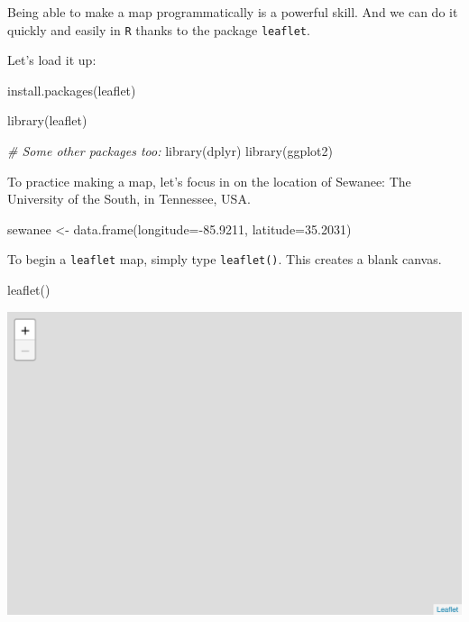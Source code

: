 \documentclass[
]{book}
\newenvironment{Shaded}{\begin{snugshade}}{\end{snugshade}}
\newcommand{\AttributeTok}[1]{\textcolor[rgb]{0.77,0.63,0.00}{#1}}
\newcommand{\CommentTok}[1]{\textcolor[rgb]{0.56,0.35,0.01}{\textit{#1}}}
\newcommand{\FloatTok}[1]{\textcolor[rgb]{0.00,0.00,0.81}{#1}}
\newcommand{\FunctionTok}[1]{\textcolor[rgb]{0.00,0.00,0.00}{#1}}
\newcommand{\NormalTok}[1]{#1}
\newcommand{\OtherTok}[1]{\textcolor[rgb]{0.56,0.35,0.01}{#1}}
\newcommand{\SpecialCharTok}[1]{\textcolor[rgb]{0.00,0.00,0.00}{#1}}
\newcommand{\StringTok}[1]{\textcolor[rgb]{0.31,0.60,0.02}{#1}}
\begin{document}
Being able to make a map programmatically is a powerful skill. And we can do it quickly and easily in \texttt{R} thanks to the package \texttt{leaflet}.

Let's load it up:

\begin{Shaded}
\begin{Highlighting}[]
\FunctionTok{install.packages}\NormalTok{(}\StringTok{\textquotesingle{}leaflet\textquotesingle{}}\NormalTok{)}
\end{Highlighting}
\end{Shaded}

\begin{Shaded}
\begin{Highlighting}[]
\FunctionTok{library}\NormalTok{(leaflet)}

\CommentTok{\# Some other packages too:}
\FunctionTok{library}\NormalTok{(dplyr)}
\FunctionTok{library}\NormalTok{(ggplot2)}
\end{Highlighting}
\end{Shaded}

To practice making a map, let's focus in on the location of Sewanee: The University of the South, in Tennessee, USA.

\begin{Shaded}
\begin{Highlighting}[]
\NormalTok{sewanee }\OtherTok{\textless{}{-}} \FunctionTok{data.frame}\NormalTok{(}\AttributeTok{longitude=}\SpecialCharTok{{-}}\FloatTok{85.9211}\NormalTok{, }
                      \AttributeTok{latitude=}\FloatTok{35.2031}\NormalTok{)}
\end{Highlighting}
\end{Shaded}

To begin a \texttt{leaflet} map, simply type \texttt{leaflet()}. This creates a blank canvas.

\begin{Shaded}
\begin{Highlighting}[]
\FunctionTok{leaflet}\NormalTok{()}
\end{Highlighting}
\end{Shaded}

\includegraphics[width=694.08px]{figures/unnamed-chunk-220-1}
\end{document}
